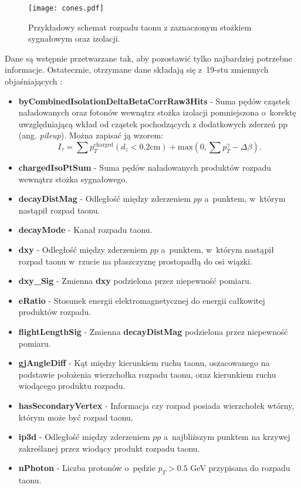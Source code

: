 \documentclass{pracalicmgr}
\begin{document}
	\begin{figure}[H]
	\centering
	\texttt{[image: cones.pdf]}
	\caption{Przykładowy schemat rozpadu taonu z zaznaczonym stożkiem sygnałowym oraz izolacji.}
	\label{fig:cones}
	\end{figure}

\newpage    
Dane są wstępnie przetwarzane tak, aby pozostawić tylko najbardziej potrzebne informacje. Ostatecznie, otrzymane dane składają się z~19-stu zmiennych objaśniających \cite{cms2016reconstruction}:

	\begin{itemize}
	\item \textbf{byCombinedIsolationDeltaBetaCorrRaw3Hits} - Suma pędów cząstek naładowanych oraz fotonów wewnątrz stożka izolacji pomniejszona o~korektę uwzględniającą wkład od cząstek pochodzących z dodatkowych zderzeń pp (ang. \textit{pileup}). Można zapisać ją wzorem:  $$I_{\tau} = \sum p_T^{\mathrm{charged}}(d_z < 0.2 \mathrm{cm}) + \mathrm{max}(0, \sum p^{\gamma}_T - \Delta\beta).$$
	\item \textbf{chargedIsoPtSum} - Suma pędów naładowanych produktów rozpadu wewnątrz stożka sygnałowego.
	\item \textbf{decayDistMag} - Odległość między zderzeniem $pp$ a~punktem, w~którym nastąpił rozpad taonu.
	\item \textbf{decayMode} - Kanał rozpadu taonu.
	\item \textbf{dxy} - Odległość między zderzeniem $pp$ a~punktem, w~którym nastąpił rozpad taonu w~rzucie na płaszczyznę prostopadłą do osi wiązki.
	\item \textbf{dxy\_Sig} - Zmienna \textbf{dxy} podzielona przez niepewność pomiaru.
	\item \textbf{eRatio} - Stosunek energii elektromagnetycznej do energii całkowitej produktów rozpadu.
	\item \textbf{flightLengthSig} - Zmienna \textbf{decayDistMag} podzielona przez niepewność pomiaru. 
	\item \textbf{gjAngleDiff} - Kąt między kierunkiem ruchu taonu, oszacowanego na podstawie położenia wierzchołka rozpadu taonu, oraz kierunkiem ruchu wiodącego produktu rozpadu.
	\item \textbf{hasSecondaryVertex} - Informacja czy rozpad posiada wierzchołek wtórny, którym może być rozpad taonu.
	\item \textbf{ip3d} - Odległość między zderzeniem $pp$ a~najbliższym punktem na krzywej zakreślanej przez wiodący produkt rozpadu taonu.
	\item \textbf{nPhoton} - Liczba protonów o~pędzie $p_T > 0.5$ GeV przypisana do rozpadu taonu.

\end{itemize}
\end{document}
